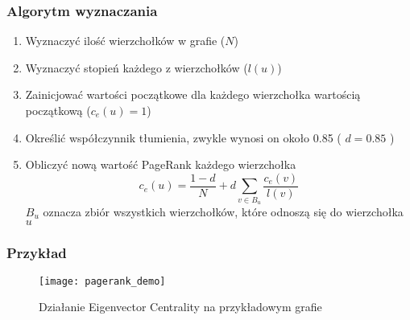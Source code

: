 \subsubsection{Algorytm wyznaczania}
\begin{enumerate}
\item Wyznaczyć ilość wierzchołków w grafie ($N$)
\item Wyznaczyć stopień każdego z wierzchołków ($l(u)$)
\item Zainicjować wartości początkowe dla każdego wierzchołka wartością początkową ($c_e(u) = 1$)
\item Określić współczynnik tłumienia, zwykle wynosi on około 0.85 ( $d = 0.85$ )
\item Obliczyć nową wartość PageRank każdego wierzchołka $$ c_e(u) = \frac{1 - d}{N} + d\sum_{v \in B_u} \frac{c_e(v)}{l(v)}$$ $B_u$ oznacza zbiór wszystkich wierzchołków, które odnoszą się do wierzchołka $u$
\end{enumerate}

\FloatBarrier
\subsubsection{Przykład}
\begin{figure}[h]
\centering
\texttt{[image: pagerank\_demo]}
\caption{Działanie Eigenvector Centrality  na przykładowym grafie}
\end{figure}
\FloatBarrier